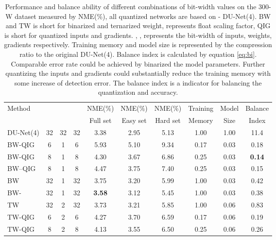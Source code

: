 \documentclass[runningheads]{llncs}
\begin{document}
\begin{table}[t!]
\begin{center}
\caption{Performance and balance ability of different combinations of bit-width values on the 300-W dataset measured by NME(\%), all quantized networks are based on - DU-Net(4). BW and TW is short for binarized and ternarized weight,  represents float scaling factor, QIG is short for quantized inputs and gradients. , ,  represents the bit-width of inputs, weights, gradients respectively. Training memory and model size is represented by the compression ratio to the original DU-Net(4). Balance index is calculated by equation \ref{eq:bi}. Comparable error rate could be achieved by binarized the model parameters. Further quantizing the inputs and gradients could substantially reduce the training memory with some increase of detection error. The balance index is a indicator for balancing the quantization and accuracy.}


\small







\label{tb:IWG-QUAN}
\begin{tabular}{lccccccccc}
\toprule
\multirow{2}{*}{Method} & {}  &   &  & NME(\%) & NME(\%) & NME(\%) & Training  &  Model & Balance\\
& & & & Full set & Easy set & Hard set & Memory & Size & Index\\

\hline
DU-Net(4)  &  32  & 32  & 32  & 3.38 & 2.95 & 5.13 & 1.00 & 1.00 & 11.4 \\
\hline
BW-QIG     &  6   & 1   & 6   & 5.93 & 5.10 & 9.34 & 0.17 & 0.03 & 0.18	\\
BW-QIG     &  8   & 1   & 8   & 4.30 & 3.67 & 6.86 & 0.25 & 0.03 & \bf{0.14}	    \\
BW--QIG    &  8   & 1   & 8   & 4.47 & 3.75 & 7.40 & 0.25 & 0.03 & 0.15  \\
BW         &  32  & 1   & 32  & 3.75 & 3.20 & 5.99 & 1.00 & 0.03 & 0.42	\\
BW-        &  32  & 1   & 32  & {\bf 3.58} & 3.12 & 5.45 & 1.00 & 0.03 & 0.38  \\
TW         &  32  & 2   & 32  & 3.73 & 3.21 & 5.85 & 1.00 & 0.06 & 0.83  \\
TW-QIG     &  6   & 2   & 6   & 4.27 & 3.70 & 6.59 & 0.17 & 0.06 & 0.19	\\
TW-QIG     &  8   & 2   & 8   & 4.13 & 3.55 & 6.50 & 0.25 & 0.06 & 0.26   \\
\bottomrule
\end{tabular}

\end{center}
\end{table}
\end{document}
